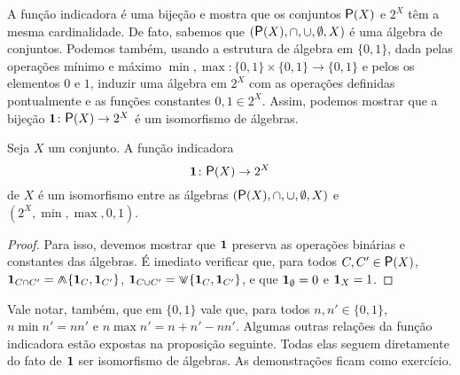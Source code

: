 A função indicadora é uma bijeção e mostra que os conjuntos $\p(X)$ e $2^X$ têm a mesma cardinalidade. De fato, sabemos que $(\p(X),\cap,\cup,\emptyset,X)$ é uma álgebra de conjuntos. Podemos também, usando a estrutura de álgebra em $\{0,1\}$, dada pelas operações mínimo e máximo $\min,\max\colon \{0,1\} \times \{0,1\} \to \{0,1\}$ e pelos os elementos $0$ e $1$, induzir uma álgebra em $2^X$ com as operações definidas pontualmente e as funções constantes $0,1 \in 2^X$. Assim, podemos mostrar que a bijeção $\idc\colon \p(X) \to 2^X$ é um isomorfismo de álgebras.

\begin{proposition}
Seja $X$ um conjunto. A função indicadora
	\begin{equation*}
	\idc\colon \p(X) \to 2^X
	\end{equation*}
de $X$ é um isomorfismo entre as álgebras $(\p(X),\cap,\cup,\emptyset,X)$ e $(2^X,\min,\max,0,1)$.
\end{proposition}
\begin{proof}
Para isso, devemos mostrar que ${\bm 1}$ preserva as operações binárias e constantes das álgebras. É imediato verificar que, para todos $C,C' \in \p(X)$, $\idc_{C \cap C'} = \min \{ \idc_C, \idc_{C'} \}$, $\idc_{C \cup C'} = \max \{ \idc_C, \idc_{C'} \}$, e que ${\bm 1}_\emptyset = 0$ e ${\bm 1}_X = 1$.
\end{proof}

Vale notar, também, que em $\{0,1\}$ vale que, para todos $n,n' \in \{0,1\}$, $n \min n' = nn'$ e $n \max n' = n+n'-nn'$. Algumas outras relações da função indicadora estão expostas na proposição seguinte. Todas elas seguem diretamente do fato de ${\bm 1}$ ser isomorfismo de álgebras. As demonstrações ficam como exercício.

